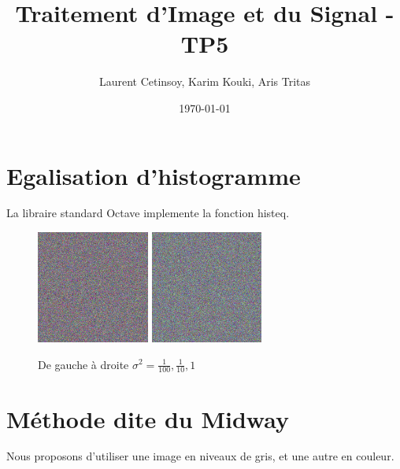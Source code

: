 \documentclass{article}
\title{Traitement d'Image et du Signal - TP5}
\author{Laurent Cetinsoy, Karim Kouki, Aris Tritas }
\date{\today}
\begin{document}
\maketitle

\section{Egalisation d'histogramme}
La libraire standard Octave implemente la fonction \textsf{histeq}. 

\begin{figure}[h]
	\includegraphics[width=0.33\textwidth]{noise001.png}
	\includegraphics[width=0.33\textwidth]{noise01.png}
  \caption{De gauche à droite $\sigma^2 = \frac{1}{100}, \frac{1}{10}, 1$}
\end{figure}

\section{Méthode dite du Midway}
Nous proposons d'utiliser une image en niveaux de gris, et une autre en couleur.
\end{document}

